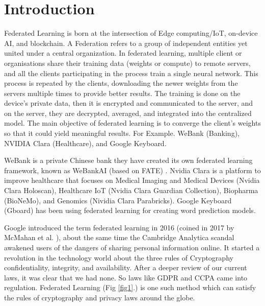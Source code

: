 \documentclass[conference]{IEEEtran}
\begin{document}
\section{Introduction}
Federated Learning is born at the intersection of Edge computing/IoT, on-device AI, and blockchain.  A Federation refers to a group of independent entities yet united under a central organization. In federated learning, multiple client or organisations share their training data (weights or compute) to remote servers, and all the clients participating in the process train a single neural network. This process is repeated by the clients, downloading the newer weights from the servers multiple times to provide better results. The training is done on the device's private data, then it is encrypted and communicated to the server, and on the server, they are decrypted, averaged, and integrated into
the centralized model. The main objective of federated learning is to converge the client's weights so that it could yield meaningful results. For Example. WeBank (Banking), NVIDIA Clara
(Healthcare), and Google Keyboard.\par
WeBank is a private Chinese bank they have created its own federated learning framework, known as WeBankAI (based on FATE) \cite{liu2021fate}. Nvidia Clara \cite{nvidia} is a platform to improve healthcare that focuses on \cite{liu2021fate} Medical Imaging and Medical Devices (Nvidia Clara Holoscan), Healthcare IoT (Nvidia Clara Guardian Collection), Biopharma (BioNeMo), and Genomics (Nividia Clara Parabricks). Google Keyboard (Gboard) \cite{yang2018applied} has been using federated learning for creating word prediction models.\par
Google introduced the term federated learning in 2016 (coined in 2017 by McMahan et al. \cite{mcmahan2017communication}), about the same time the Cambridge Analytica scandal awakened users of the dangers of sharing personal information online. It started a revolution in the technology world about the three rules of Cryptography confidentiality, integrity, and availability. After a deeper review of our current laws, it was clear that we had none. So laws like GDPR and CCPA came into regulation. Federated Learning (Fig \ref{fig1}.) is one such method which can satisfy the rules of cryptography and privacy laws around the globe.\par 
\end{document}
